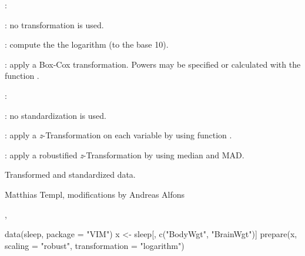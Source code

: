\begin{Details}\relax

:

: no transformation is used.

: compute the the logarithm (to the base 10).

: apply a Box-Cox transformation. Powers may be specified 
or calculated with the function .

:

: no standardization is used.

: apply a \emph{z}-Transformation on each variable 
by using function .

: apply a robustified \emph{z}-Transformation by using 
median and MAD. 

\end{Details}
%
\begin{Value}
Transformed and standardized data.
\end{Value}
%
\begin{Author}\relax
Matthias Templ, modifications by Andreas Alfons
\end{Author}
%
\begin{SeeAlso}\relax
{}, 
\end{SeeAlso}
%
\begin{Examples}
\begin{ExampleCode}
data(sleep, package = "VIM")
x <- sleep[, c("BodyWgt", "BrainWgt")]
prepare(x, scaling = "robust", transformation = "logarithm")
\end{ExampleCode}
\end{Examples}

